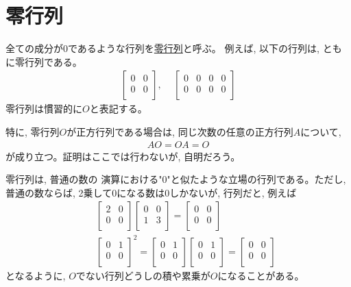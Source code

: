 \section{零行列}

全ての成分が0であるような行列を\underline{零行列}と呼ぶ。
例えば, 以下の行列は, ともに零行列である。
\begin{eqnarray}\begin{bmatrix}
0 & 0 \\
0 & 0 \\
\end{bmatrix},\,\,\,\,\,\,\,
\begin{bmatrix}
0 & 0 & 0 & 0 \\
0 & 0 & 0 & 0 \\
\end{bmatrix}\end{eqnarray}
零行列は慣習的に$O$と表記する。

特に, 零行列$O$が正方行列である場合は, 同じ次数の任意の正方行列$A$について, 
\begin{eqnarray}
AO=OA=O
\end{eqnarray}
が成り立つ。証明はここでは行わないが, 自明だろう。

零行列は, 普通の数の
演算における"0"と似たような立場の行列である。ただし, 普通の数ならば, 
2乗して0になる数は0しかないが, 行列だと, 例えば
\begin{eqnarray*} 
&&\begin{bmatrix}
2 & 0 \\
0 & 0 \\
\end{bmatrix}
\begin{bmatrix}
0 & 0 \\
1 & 3 \\
\end{bmatrix}=
\begin{bmatrix}
0 & 0 \\
0 & 0 \\
\end{bmatrix}\\
&&\begin{bmatrix}
0 & 1 \\
0 & 0 \\
\end{bmatrix}^2=
\begin{bmatrix}
0 & 1 \\
0 & 0 \\
\end{bmatrix}
\begin{bmatrix}
0 & 1 \\
0 & 0 \\
\end{bmatrix}=
\begin{bmatrix}
0 & 0 \\
0 & 0 \\
\end{bmatrix}
\end{eqnarray*}
となるように, $O$でない行列どうしの積や累乗が$O$になることがある。
\vv


